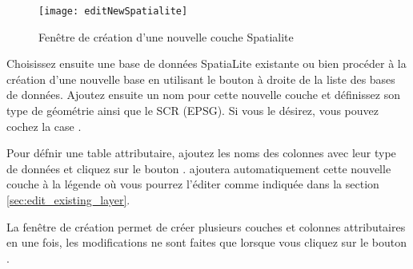 \begin{figure}[ht]
   \centering
   \texttt{[image: editNewSpatialite]}
   \caption{Fenêtre de création d'une nouvelle couche Spatialite \nixcaption}\label{fig:newspatialitelayer}
\end{figure}


Choisissez ensuite une base de données SpatiaLite existante ou bien procéder à la création d'une nouvelle base en utilisant le bouton  à droite de la liste des bases de données. Ajoutez ensuite un nom pour cette nouvelle couche et définissez son type de géométrie ainsi que le SCR (EPSG). Si vous le désirez, vous pouvez cochez la case .


Pour défnir une table attributaire, ajoutez les noms des colonnes avec leur type de données et cliquez sur le bouton . \qg ajoutera automatiquement cette nouvelle couche à la légende où vous pourrez l'éditer comme indiquée dans la section \ref{sec:edit_existing_layer}.

La fenêtre de création permet de créer plusieurs couches et colonnes attributaires en une fois, les modifications ne sont faites que lorsque vous cliquez sur le bouton .

